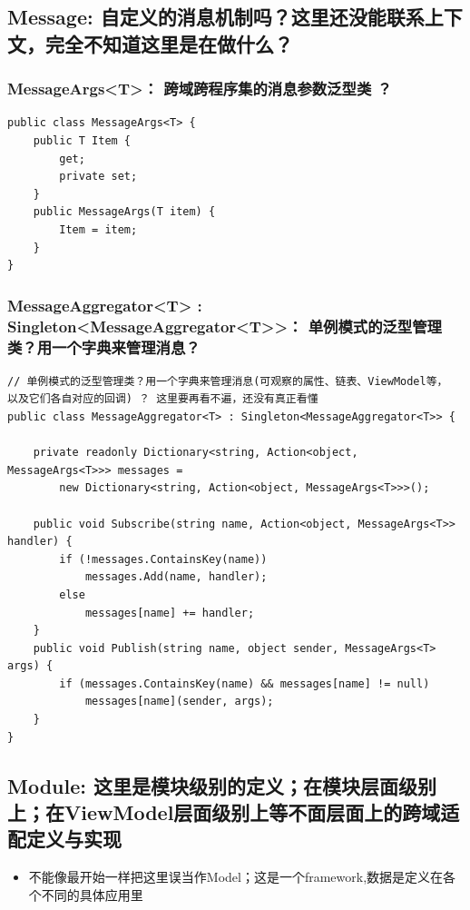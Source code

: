 \documentclass[9pt, b5paper]{article}
\begin{document}
\subsection{Message: 自定义的消息机制吗？这里还没能联系上下文，完全不知道这里是在做什么？}
\label{sec-6-2}
\subsubsection{MessageArgs<T>： 跨域跨程序集的消息参数泛型类 ？}
\label{sec-6-2-1}
\begin{verbatim}
public class MessageArgs<T> {
    public T Item {
        get;
        private set;
    }
    public MessageArgs(T item) {
        Item = item;
    }
}
\end{verbatim}
\subsubsection{MessageAggregator<T> : Singleton<MessageAggregator<T>>： 单例模式的泛型管理类？用一个字典来管理消息？}
\label{sec-6-2-2}
\begin{verbatim}
// 单例模式的泛型管理类？用一个字典来管理消息(可观察的属性、链表、ViewModel等， 以及它们各自对应的回调) ？ 这里要再看不遍，还没有真正看懂
public class MessageAggregator<T> : Singleton<MessageAggregator<T>> {

    private readonly Dictionary<string, Action<object, MessageArgs<T>>> messages =
        new Dictionary<string, Action<object, MessageArgs<T>>>();

    public void Subscribe(string name, Action<object, MessageArgs<T>> handler) {
        if (!messages.ContainsKey(name)) 
            messages.Add(name, handler);
        else 
            messages[name] += handler;
    }
    public void Publish(string name, object sender, MessageArgs<T> args) {
        if (messages.ContainsKey(name) && messages[name] != null) 
            messages[name](sender, args);
    }
}
\end{verbatim}
\subsection{Module: 这里是模块级别的定义；在模块层面级别上；在ViewModel层面级别上等不面层面上的跨域适配定义与实现}
\label{sec-6-3}
\begin{itemize}
\item 不能像最开始一样把这里误当作Model；这是一个framework,数据是定义在各个不同的具体应用里
\end{itemize}
\end{document}
